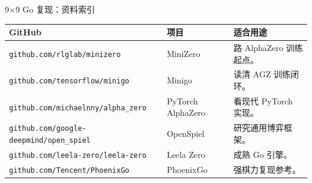 \documentclass[UTF8,aspectratio=169,10pt]{ctexbeamer}
\begin{document}
\begin{frame}{9$\times$9 Go 复现：资料索引}
  \scriptsize
  \begin{center}
    \begin{tabular}{@{}>{\raggedright\arraybackslash}p{}>{\raggedright\arraybackslash}p{}>{\raggedright\arraybackslash}p{}@{}}
      \toprule
      GitHub & 项目 & 适合用途 \\
      \midrule
      \texttt{github.com/\allowbreak rlglab/\allowbreak minizero} &
      MiniZero &
      9 路 AlphaZero 训练起点。 \\
      \texttt{github.com/\allowbreak tensorflow/\allowbreak minigo} &
      Minigo &
      读清 AGZ 训练闭环。 \\
      \texttt{github.com/\allowbreak michaelnny/\allowbreak alpha\_zero} &
      PyTorch AlphaZero &
      看现代 PyTorch 实现。 \\
      \texttt{github.com/\allowbreak google-deepmind/\allowbreak open\_spiel} &
      OpenSpiel &
      研究通用博弈框架。 \\
      \texttt{github.com/\allowbreak leela-zero/\allowbreak leela-zero} &
      Leela Zero &
      成熟 Go 引擎。 \\
      \texttt{github.com/\allowbreak Tencent/\allowbreak PhoenixGo} &
      PhoenixGo &
      强棋力复现参考。 \\
      \bottomrule
    \end{tabular}
  \end{center}
\end{frame}
\end{document}
